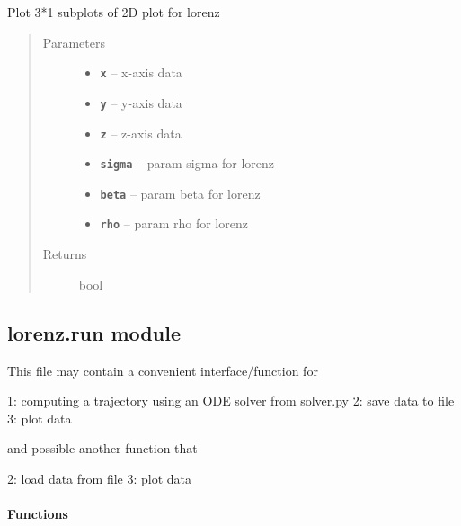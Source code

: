 \documentclass[letterpaper,10pt,english]{sphinxmanual}
\begin{document}
\begin{fulllineitems}
\label{_autosummary/lorenz:lorenz.plot.plot2Dpdf}
Plot 3*1 subplots of 2D plot for lorenz
\begin{quote}\begin{description}
\item[{Parameters}] \leavevmode\begin{itemize}
\item {} 
\textbf{\texttt{x}} -- x-axis data

\item {} 
\textbf{\texttt{y}} -- y-axis data

\item {} 
\textbf{\texttt{z}} -- z-axis data

\item {} 
\textbf{\texttt{sigma}} -- param sigma for lorenz

\item {} 
\textbf{\texttt{beta}} -- param beta for lorenz

\item {} 
\textbf{\texttt{rho}} -- param rho for lorenz

\end{itemize}

\item[{Returns}] \leavevmode
bool

\end{description}\end{quote}

\end{fulllineitems}



\subsection{lorenz.run module}
\label{_autosummary/lorenz:lorenz-run-module}\label{_autosummary/lorenz:module-lorenz.run}
This file may contain a convenient interface/function for

1: computing a trajectory using an ODE solver from solver.py
2: save data to file
3: plot data

and possible another function that

2: load data from file
3: plot data
\paragraph{Functions}
\end{document}
